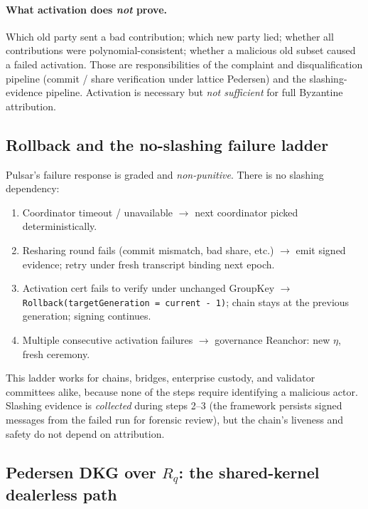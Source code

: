 \paragraph{What activation does \emph{not} prove.}
Which old party sent a bad contribution; which new party lied; whether
all contributions were polynomial-consistent; whether a malicious old
subset caused a failed activation. Those are responsibilities of the
complaint and disqualification pipeline (commit / share verification
under lattice Pedersen) and the slashing-evidence pipeline. Activation
is necessary but \emph{not sufficient} for full Byzantine attribution.

\subsection{Rollback and the no-slashing failure ladder}
\label{sec:lifecycle:rollback}

Pulsar's failure response is graded and \emph{non-punitive}. There is
no slashing dependency:

\begin{enumerate}[leftmargin=2em,nosep]
  \item Coordinator timeout / unavailable
        $\rightarrow$ next coordinator picked deterministically.
  \item Resharing round fails (commit mismatch, bad share, etc.)
        $\rightarrow$ emit signed evidence; retry under fresh
        transcript binding next epoch.
  \item Activation cert fails to verify under unchanged GroupKey
        $\rightarrow$ \texttt{Rollback(targetGeneration = current - 1)};
        chain stays at the previous generation; signing continues.
  \item Multiple consecutive activation failures
        $\rightarrow$ governance Reanchor: new $\eta$, fresh ceremony.
\end{enumerate}

This ladder works for chains, bridges, enterprise custody, and
validator committees alike, because none of the steps require
identifying a malicious actor. Slashing evidence is \emph{collected}
during steps 2--3 (the framework persists signed messages from the
failed run for forensic review), but the chain's liveness and safety
do not depend on attribution.

\subsection{Pedersen DKG over $R_q$: the shared-kernel dealerless path}
\label{sec:lifecycle:dkg}


